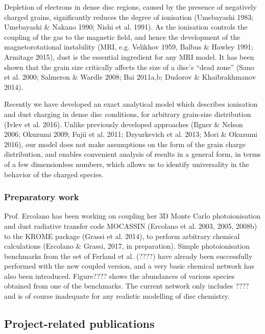 \documentclass[10pt,fleqn,twoside]{article}
\newcommand{\Tcol}{\color{blue}}
\begin{document}
Depletion of electrons in dense disc regions, caused by the presence of negatively charged grains, significantly reduces the
degree of ionisation (Umebayashi 1983; Umebayashi \& Nakano 1990; Nishi et al. 1991). As the ionisation controls the coupling of the gas to the magnetic field, and hence the development of the magnetorotational instability (MRI, e.g. Velikhov 1959, Balbus \& Hawley 1991; Armitage 2015), dust is the essential ingredient for any MRI model. It has been shown that the grain size critically affects the size of a disc's ``dead zone'' (Sano et al. 2000; Salmeron \& Wardle 2008; Bai 2011a,b; Dudorov \& Khaibrakhmanov 2014).

Recently we have developed an exact analytical model which describes ionisation and dust charging in dense disc conditions,
for arbitrary grain-size distribution (Ivlev et al. 2016). Unlike previously developed approaches (Ilgner \& Nelson 2006; Okuzumi 2009; Fujii et al. 2011; Dzyurkevich et al. 2013; Mori \& Okuzumi 2016), our model does not make assumptions on the form of the grain charge distribution, and enables convenient analysis of results in a general form, in terms of a few dimensionless numbers, which allows us to identify universality in the behavior of the charged species.

\subsubsection{Preparatory work}

Prof. Ercolano has been working on coupling her 3D Monte Carlo photoionisation
and dust radiative transfer code MOCASSIN (Ercolano et al. 2003, 2005,
2008b) to the KROME package (Grassi et al. 2014), to perform arbitrary
chemical calculations (Ercolano \& Grassi, 2017, in
preparation). Simple photoionisation benchmarks from the set of
Ferland et al. (????) have already been successfully performed with
the new coupled version, and a very basic chemical network has also
been introduced. Figure???? shows the abundances of various species obtained from one of the benchmarks. 
The current network only includes ????  and is of course inadequate for any realistic modelling of disc chemistry. 

\subsection{\Tcol Project-related publications}
\end{document}
